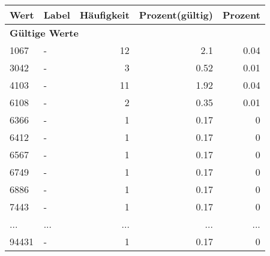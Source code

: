      \begin{longtable}{lXrrr}
     \toprule
     \textbf{Wert} & \textbf{Label} & \textbf{Häufigkeit} & \textbf{Prozent(gültig)} & \textbf{Prozent} \\
     \endhead
     \midrule
     \multicolumn{5}{l}{\textbf{Gültige Werte}}\\
        1067 & \multicolumn{1}{X}{-} & %
          \num{12} &
          \num[round-mode=places,round-precision=2]{2,1} &
          \num[round-mode=places,round-precision=2]{0,04} \\
        3042 & \multicolumn{1}{X}{-} & %
          \num{3} &
          \num[round-mode=places,round-precision=2]{0,52} &
          \num[round-mode=places,round-precision=2]{0,01} \\
        4103 & \multicolumn{1}{X}{-} & %
          \num{11} &
          \num[round-mode=places,round-precision=2]{1,92} &
          \num[round-mode=places,round-precision=2]{0,04} \\
        6108 & \multicolumn{1}{X}{-} & %
          \num{2} &
          \num[round-mode=places,round-precision=2]{0,35} &
          \num[round-mode=places,round-precision=2]{0,01} \\
        6366 & \multicolumn{1}{X}{-} & %
          \num{1} &
          \num[round-mode=places,round-precision=2]{0,17} &
          \num[round-mode=places,round-precision=2]{0} \\
        6412 & \multicolumn{1}{X}{-} & %
          \num{1} &
          \num[round-mode=places,round-precision=2]{0,17} &
          \num[round-mode=places,round-precision=2]{0} \\
        6567 & \multicolumn{1}{X}{-} & %
          \num{1} &
          \num[round-mode=places,round-precision=2]{0,17} &
          \num[round-mode=places,round-precision=2]{0} \\
        6749 & \multicolumn{1}{X}{-} & %
          \num{1} &
          \num[round-mode=places,round-precision=2]{0,17} &
          \num[round-mode=places,round-precision=2]{0} \\
        6886 & \multicolumn{1}{X}{-} & %
          \num{1} &
          \num[round-mode=places,round-precision=2]{0,17} &
          \num[round-mode=places,round-precision=2]{0} \\
        7443 & \multicolumn{1}{X}{-} & %
          \num{1} &
          \num[round-mode=places,round-precision=2]{0,17} &
          \num[round-mode=places,round-precision=2]{0} \\
       ... & ... & ... & ... & ... \\
        94431 & \multicolumn{1}{X}{-} & %
          \num{1} &
          \num[round-mode=places,round-precision=2]{0,17} &
          \num[round-mode=places,round-precision=2]{0} \\


\end{longtable}
